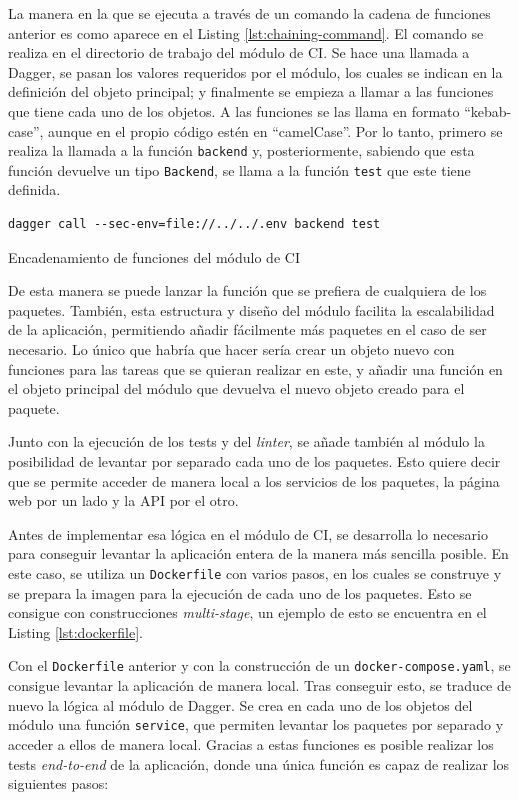 La manera en la que se ejecuta a través de un comando la cadena de funciones anterior es como aparece en el Listing \ref{lst:chaining-command}. El comando se realiza en el directorio de trabajo del módulo de CI. Se hace una llamada a Dagger, se pasan los valores requeridos por el módulo, los cuales se indican en la definición del objeto principal; y finalmente se empieza a llamar a las funciones que tiene cada uno de los objetos. A las funciones se las llama en formato ``kebab-case'', aunque en el propio código estén en ``camelCase''. Por lo tanto, primero se realiza la llamada a la función \texttt{backend} y, posteriormente, sabiendo que esta función devuelve un tipo \texttt{Backend}, se llama a la función \texttt{test} que este tiene definida.

\begin{listing}[!ht]
  \begin{verbatim}
dagger call --sec-env=file://../../.env backend test
\end{verbatim}
\caption{Encadenamiento de funciones del módulo de CI}
\label{lst:chaining-command}
\end{listing}

De esta manera se puede lanzar la función que se prefiera de cualquiera de los paquetes. También, esta estructura y diseño del módulo facilita la escalabilidad de la aplicación, permitiendo añadir fácilmente más paquetes en el caso de ser necesario. Lo único que habría que hacer sería crear un objeto nuevo con funciones para las tareas que se quieran realizar en este, y añadir una función en el objeto principal del módulo que devuelva el nuevo objeto creado para el paquete.

Junto con la ejecución de los tests y del \textit{linter}, se añade también al módulo la posibilidad de levantar por separado cada uno de los paquetes. Esto quiere decir que se permite acceder de manera local a los servicios de los paquetes, la página web por un lado y la API por el otro.

Antes de implementar esa lógica en el módulo de CI, se desarrolla lo necesario para conseguir levantar la aplicación entera de la manera más sencilla posible. En este caso, se utiliza un \texttt{Dockerfile} con varios pasos, en los cuales se construye y se prepara la imagen para la ejecución de cada uno de los paquetes. Esto se consigue con construcciones \textit{multi-stage}, un ejemplo de esto se encuentra en el Listing \ref{lst:dockerfile}.

Con el \texttt{Dockerfile} anterior y con la construcción de un \texttt{docker-compose.yaml}, se consigue levantar la aplicación de manera local. Tras conseguir esto, se traduce de nuevo la lógica al módulo de Dagger. Se crea en cada uno de los objetos del módulo una función \texttt{service}, que permiten levantar los paquetes por separado y acceder a ellos de manera local. Gracias a estas funciones es posible realizar los tests \textit{end-to-end} de la aplicación, donde una única función es capaz de realizar los siguientes pasos:

